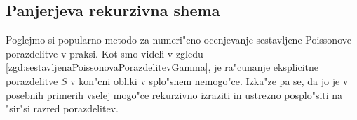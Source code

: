 \documentclass[12pt, a4paper, reqno]{amsart}
\theoremstyle{definition}
\theoremstyle{plain}
\newcommand{\1}{\mathds{1}}
\begin{document}
%
%





    \subsection{Panjerjeva rekurzivna shema}
    Poglejmo si popularno metodo za numeri"cno ocenjevanje sestavljene Poissonove porazdelitve v praksi. Kot
    smo videli v zgledu \ref{zgd:sestavljenaPoissonovaPorazdelitevGamma}, je ra"cunanje eksplicitne 
    porazdelitve $S$ v kon"cni obliki v splo"snem nemogo"ce. Izka"ze pa se, da jo je v posebnih primerih vselej mogo"ce
    rekurzivno izraziti in ustrezno posplo"siti na "sir"si razred porazdelitev.
\end{document}
